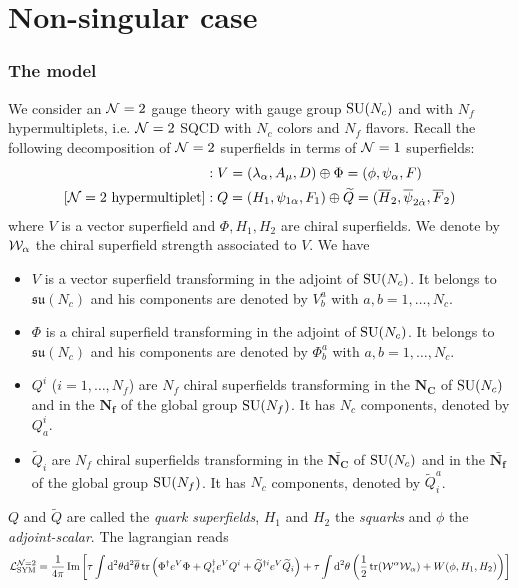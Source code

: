 \part{Non-singular case}

\section{The model}

    We consider an $\mathcal{N}=2$ gauge theory with gauge group $\text{SU}(N_c)$ and with $N_f$ hypermultiplets, i.e. $\mathcal{N}=2$ SQCD with $N_c$ colors and $N_f$ flavors. Recall the following decomposition of $\mathcal{N}=2$ superfields in terms of $\mathcal{N}=1$ superfields:
    \begin{align}
        [\mN=2 \text{ vector multiplet}] &: V=(\lambda_\alpha,A_\mu,D)\oplus \Phi=(\phi,\psi_\alpha,F)\\
        [\mN=2 \text{ hypermultiplet}] &: Q=(H_1,\psi_{1\alpha},F_1) \oplus \tilde{Q}=(\bar{H}_2,\bar{\psi}_{2\dalpha},\bar{F}_2)
    \end{align}
    where $V$ is a vector superfield and $\Phi,H_1,H_2$ are chiral superfields. We denote by $\mathcal{W}_\alpha$ the chiral superfield strength associated to $V$. We have
    \begin{itemize}
        \item $V$ is a vector superfield transforming in the adjoint of $\text{SU}(N_c)$. It belongs to $\mathfrak{su}(N_c)$ and his components are denoted by $V^a_b$ with $a,b=1,\dots,N_c$.
        \item $\Phi$ is a chiral superfield transforming in the adjoint of $\text{SU}(N_c)$. It belongs to $\mathfrak{su}(N_c)$ and his components are denoted by $\Phi^a_b$ with $a,b=1,\dots,N_c$.
        \item $Q^i$ ($i=1,\dots,N_f$) are $N_f$ chiral superfields transforming in the $\boldsymbol{N_C}$ of $\text{SU}(N_c)$ and in the $\boldsymbol{N_f}$ of the global group $\text{SU}(N_f)$. It has $N_c$ components, denoted by $Q^i_a$.
        \item $\tilde{Q}_i$ are $N_f$ chiral superfields transforming in the $\bar{\boldsymbol{N_C}}$ of $\text{SU}(N_c)$ and in the $\bar{\boldsymbol{N_f}}$ of the global group $\text{SU}(N_f)$. It has $N_c$ components, denoted by $\tilde{Q}^a_i$.
    \end{itemize}
    $Q$ and $\tilde{Q}$ are called the \emph{quark superfields}, $H_1$ and $H_2$ the \emph{squarks} and $\phi$ the \emph{adjoint-scalar}. The lagrangian reads
    \begin{equation}
        \mathcal{L}^{\mathcal{N}=2}_{\text{SYM}} = \frac{1}{4\pi}\Im\left[\tau\int\text{d}^2\theta\text{d}^2\overline{\theta}\tr\left(\Phi^\dagger e^V\Phi + Q^\dagger_i e^V Q^i + \widetilde{Q}^{\dagger i}e^V \widetilde{Q}_i\right)+\tau\int\text{d}^2\theta\left(\frac{1}{2}\tr(\mathcal{W}^\alpha\mathcal{W}_\alpha)+W(\phi,H_1,H_2)\right)\right]\label{eq:lag}
    \end{equation}
